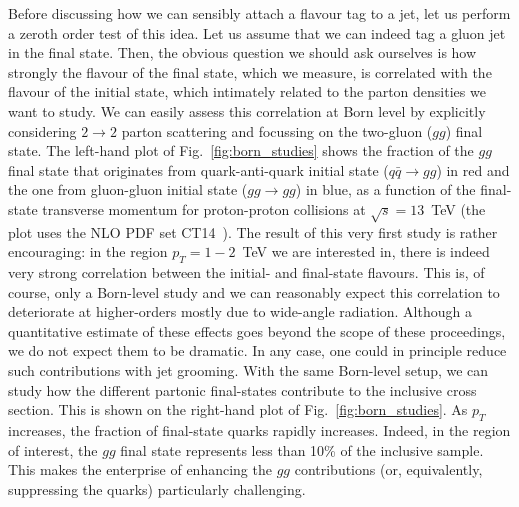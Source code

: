 Before discussing how we can sensibly attach a flavour tag to a jet, let us perform a zeroth order test of this idea. Let us assume that we can indeed tag a gluon jet in the final state. Then, the obvious question we should ask ourselves is how strongly the flavour of the final state, which we measure, is correlated with the flavour of the initial state, which intimately related to the parton densities we want to study. 
%
We can easily assess this correlation at Born level by explicitly considering $2 \to 2$ parton scattering and focussing on the two-gluon ($gg$) final state. The left-hand plot of Fig.~\ref{fig:born_studies} shows the fraction of the $gg$ final state that originates from quark-anti-quark initial state ($q \bar q \to gg$) in red and the one from gluon-gluon initial state ($gg \to gg$)  in blue, as a function of the final-state transverse momentum for proton-proton collisions at $\sqrt{s}=13$~TeV (the plot uses the NLO PDF set CT14~\cite{Dulat:2015mca}). 
%
The result of this very first study is rather encouraging: in the region $p_T=1-2$~TeV we are interested in, there is indeed very strong correlation between the initial- and final-state flavours. This is, of course, only a Born-level study and we can reasonably expect this correlation to deteriorate at higher-orders mostly due to wide-angle radiation. 
%
Although a quantitative estimate of these effects goes beyond the scope of these proceedings, we do not expect them to be dramatic. In any case, one could in principle reduce such contributions with jet grooming. 
%
With the same Born-level setup, we can study how the different partonic final-states contribute to the inclusive cross section. This is shown on the right-hand plot of Fig.~\ref{fig:born_studies}. As $p_T$ increases, the fraction of final-state quarks rapidly increases. Indeed, in the region of interest, the $gg$ final state represents less than 10\% of the inclusive sample. This makes the enterprise of enhancing the $gg$ contributions (or, equivalently, suppressing the quarks) particularly challenging. 



